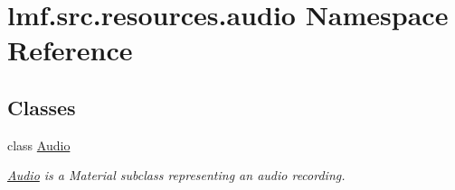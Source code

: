 \hypertarget{namespacelmf_1_1src_1_1resources_1_1audio}{\section{lmf.\+src.\+resources.\+audio Namespace Reference}
\label{namespacelmf_1_1src_1_1resources_1_1audio}
}
\subsection*{Classes}
\begin{DoxyCompactItemize}
\item 
class \hyperlink{classlmf_1_1src_1_1resources_1_1audio_1_1_audio}{Audio}
\begin{DoxyCompactList}\small\item\em \hyperlink{classlmf_1_1src_1_1resources_1_1audio_1_1_audio}{Audio} is a Material subclass representing an audio recording. \end{DoxyCompactList}\end{DoxyCompactItemize}
